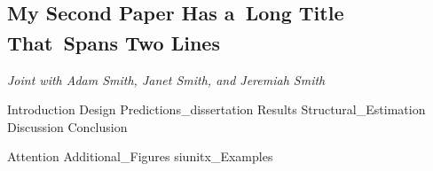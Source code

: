 \documentclass[11pt, a4paper, twoside]{book}
\begin{document}


\renewcommand{\currentchapter}{Ch2}

\begin{refsection}

\makeatletter
\renewcommand{\@makefntext}[1]{\@makefntextorig{#1}}
\makeatother
\chapter
	[My Second Paper Has a~Long Title That\nolinebreak\  Spans Two Lines]
	{My Second Paper Has a\nolinebreak\ Long Title That\nolinebreak\  Spans Two Lines%
	 \setcounter{footnote}{1}\textsuperscript{\Large{}}%
	}
\label{diss:MySecondPaper}
\renewcommand{\thefootnote}{\fnsymbol{footnote}}
\footnotetext[1]{\:\protect}
\renewcommand{\thefootnote}{\thefootnoteorig}
\makeatletter
\renewcommand{\@makefntext}[1]{\@makefntextcustom{#1}}
\renewcommand{\@makefnmark}{\@makefnmarkorig}
\makeatother
\setcounter{footnote}{0}
\vspace{-\bigskipamount}\textsf{\textit{Joint with Adam Smith, Janet Smith, and Jeremiah Smith}} \bigskip

\graphicspath{{1_Example_Content/}}
{Introduction}
{Design}
{Predictions_dissertation}
{Results}
{Structural_Estimation}
{Discussion}
{Conclusion}

\FloatBarrier
\clearpage

\begin{subappendices}
	\label{sec:appendix}
	\FloatBarrier
	\clearpage
	{Attention}
	\FloatBarrier
	\clearpage
	{Additional_Figures}
	\FloatBarrier
	\clearpage
	{siunitx_Examples}
	\FloatBarrier
	\clearpage
\end{subappendices}

\begin{refcontext}[sorting=nyt]
	\printbibliography[heading=subbibliography]
\end{refcontext}

\end{refsection}
\end{document}
